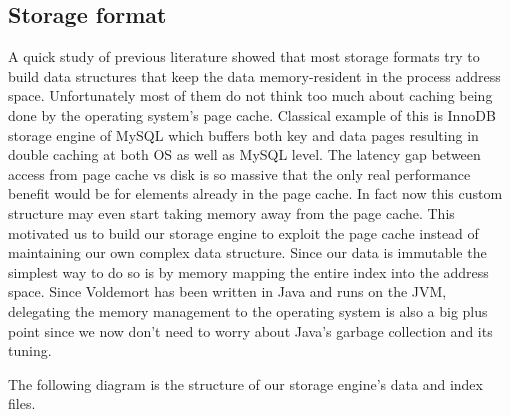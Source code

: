 \documentclass[10pt,twocolumn,preprint,natbib,authoryear]{sigplanconf}
\begin{document}

\subsection{Storage format}
\label{sec:read_only:storage_format}

A quick study of previous literature showed that most storage formats try to build data structures that keep the data memory-resident in the process address space. Unfortunately most of them do not think too much about caching being done by the operating system's page cache. Classical example of this is InnoDB storage engine of MySQL which buffers both key and data pages resulting in double caching \cite{Page 203 - Understanding MySQL internals} at both OS as well as MySQL level. The latency gap between access from page cache vs disk is so massive that the only real performance benefit would be for elements already in the page cache. In fact now this custom structure may even start taking memory away from the page cache. This motivated us to build our storage engine to exploit the page cache instead of maintaining our own complex data structure. Since our data is immutable the simplest way to do so is by memory mapping the entire index into the address space. Since Voldemort has been written in Java and runs on the JVM, delegating the memory management to the operating system is also a big plus point since we now don't need to worry about Java's garbage collection and its tuning.

The following diagram is the structure of our storage engine's data and index files. 
\end{document}
